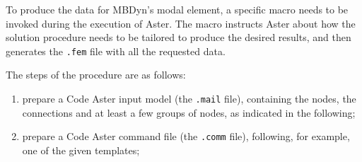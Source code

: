 To produce the data for MBDyn's modal element, a specific macro 
needs to be invoked during the execution of Aster.
The macro instructs Aster about how the solution procedure
needs to be tailored to produce the desired results, and then
generates the \texttt{.fem} file with all the requested data.

The steps of the procedure are as follows:
\begin{enumerate} %

\item prepare a Code Aster input model (the \texttt{.mail} file),
containing the nodes, the connections and at least a few groups
of nodes, as indicated in the following;

\item prepare a Code Aster command file (the \texttt{.comm} file),
following, for example, one of the given templates;


\end{enumerate}
